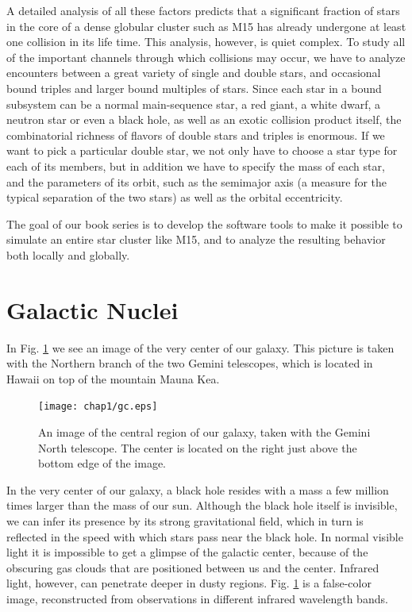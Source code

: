 A detailed analysis of all these factors predicts that a significant
fraction of stars in the core of a dense globular cluster such as M15
has already undergone at least one collision in its life time.  This
analysis, however, is quiet complex.  To study all of the important
channels through which collisions may occur, we have to analyze
encounters between a great variety of single and double stars, and
occasional bound triples and larger bound multiples of stars.  Since
each star in a bound subsystem can be a normal main-sequence star, a
red giant, a white dwarf, a neutron star or even a black hole, as well
as an exotic collision product itself, the combinatorial richness of
flavors of double stars and triples is enormous.  If we want to pick a
particular double star, we not only have to choose a star type for
each of its members, but in addition we have to specify the mass of
each star, and the parameters of its orbit, such as the semimajor axis
(a measure for the typical separation of the two stars) as well as the
orbital eccentricity.

The goal of our book series is to develop the software tools to make
it possible to simulate an entire star cluster like M15, and to
analyze the resulting behavior both locally and globally.

\clearpage  %

\section{Galactic Nuclei}

In Fig. \ref{fig:gc} we see an image of the very center of our galaxy.
This picture is taken with the Northern branch of the two Gemini
telescopes, which is located in Hawaii on top of the mountain Mauna Kea.

\begin{figure}[ht]
\centering
\texttt{[image: chap1/gc.eps]}
\caption[An image of the central region of our galaxy]
{An image of the central region of our galaxy, taken with the Gemini
North telescope.  The center is located on the right just above the
bottom edge of the image.}
\label{fig:gc}
\end{figure}

In the very center of our galaxy, a black hole resides with a mass
a few million times larger than the mass of our sun.  Although the
black hole itself is invisible, we can infer its presence by its
strong gravitational field, which in turn is reflected in the speed
with which stars pass near the black hole.  In normal visible light it
is impossible to get a glimpse of the galactic center, because of the
obscuring gas clouds that are positioned between us and the center.
Infrared light, however, can penetrate deeper in dusty regions.
Fig. \ref{fig:gc} is a false-color image, reconstructed from
observations in different infrared wavelength bands.

